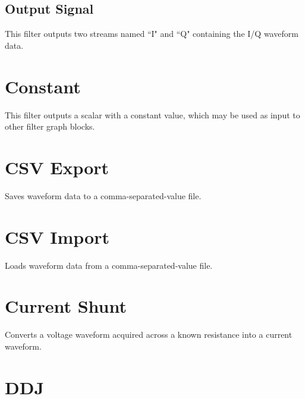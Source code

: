 \subsection{Output Signal}

This filter outputs two streams named ``I" and ``Q" containing the I/Q waveform data.

\pagebreak
\section{Constant}
\label{filter:constant}

This filter outputs a scalar with a constant value, which may be used as input to other filter graph blocks.

\pagebreak
\section{CSV Export}

Saves waveform data to a comma-separated-value file.

\pagebreak
\section{CSV Import}

Loads waveform data from a comma-separated-value file.


\pagebreak
\section{Current Shunt}

Converts a voltage waveform acquired across a known resistance into a current waveform.

\pagebreak
\section{DDJ}
\label{filter:ddj}

